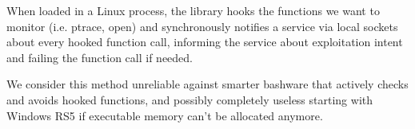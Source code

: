         When loaded in a Linux process, the library hooks the functions we want to monitor (i.e. ptrace, open) and synchronously notifies a 
        service via local sockets about every hooked function call, informing the service about exploitation intent and failing the function call
        if needed.

        We consider this method unreliable against smarter bashware that actively checks and avoids hooked functions, and possibly completely useless
        starting with Windows RS5 if executable memory can't be allocated anymore.
